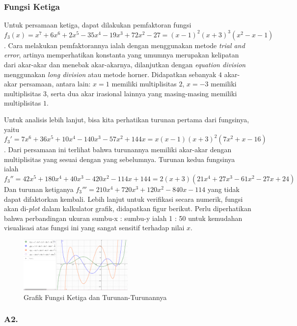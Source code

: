 \documentclass[11pt, a4paper, onecolumn, oneside, final]{report}
\begin{document}
\subsubsection*{Fungsi Ketiga}

Untuk persamaan ketiga, dapat dilakukan pemfaktoran fungsi $f_3(x) = x^7+6x^6+2x^5-35x^4-19x^3+72x^2-27= (x-1)^2(x+3)^3(x^2-x-1)$. Cara melakukan pemfaktorannya ialah dengan menggunakan metode \textit{trial and error}, artinya memperhatikan konstanta yang umumnya merupakan kelipatan dari akar-akar dan menebak akar-akarnya, dilanjutkan dengan \textit{equation division} menggunakan \textit{long division} atau metode horner. Didapatkan sebanyak $4$ akar-akar persamaan, antara lain: $x = 1$ memiliki multiplisitas $2$, $x = -3$ memiliki multiplisitas $3$, serta dua akar irasional lainnya yang masing-masing memiliki multiplisitas $1$.

Untuk analisis lebih lanjut, bisa kita perhatikan turunan pertama dari fungsinya, yaitu $f_3' = 7x^6+36x^5+10x^4-140x^3-57x^2+144x = x(x - 1)(x + 3)^2(7x^2 + x - 16)$. Dari persamaan ini terlihat bahwa turunannya memiliki akar-akar dengan multiplisitas yang sesuai dengan yang sebelumnya. Turunan kedua fungsinya ialah $f_3'' = 42x^5+180x^4+40x^3-420x^2-114x+144 = 2 (x + 3) (21 x^4 + 27 x^3 - 61 x^2 - 27 x + 24)$ Dan turunan ketiganya $f_3''' = 210 x^4 + 720 x^3 + 120 x^2 - 840 x - 114$ yang tidak dapat difaktorkan kembali. Lebih lanjut untuk verifikasi secara numerik, fungsi akan di-\textit{plot} dalam kalkulator grafik, didapatkan figur berikut. Perlu diperhatikan bahwa perbandingan ukuran sumbu-x : sumbu-y ialah 1 : 50 untuk kemudahan visualisasi atas fungsi ini yang sangat sensitif terhadap nilai $x$.

\begin{figure}[h!]
    \centering
    \includegraphics[width=0.5\textwidth]{assets/A1_3.png}
    \caption{Grafik Fungsi Ketiga dan Turunan-Turunannya}
\end{figure}

\subsubsection*{A2.}
\end{document}
